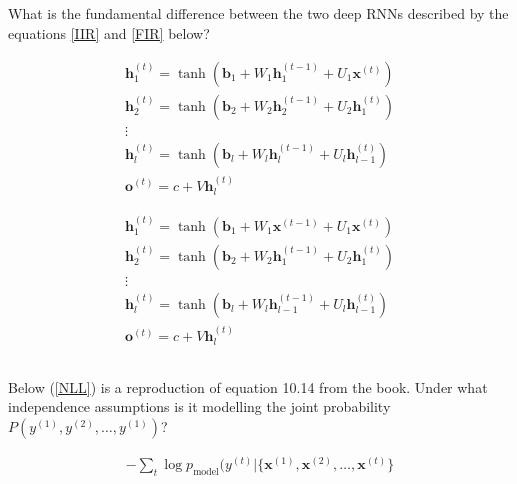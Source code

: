 \documentclass[a4paper]{report} \usepackage{amsmath}
\renewcommand{\vec}[1]{{\boldsymbol{#1}}}
\newcommand{\tvec}[2]{{\vec{#1}^{(#2)}}}
\newcommand{\stvec}[3]{{\vec{#1}_{#2}^{(#3)}}}
\begin{document}
\subsection{} What is the fundamental difference between the two deep RNNs described by the equations \ref{IIR} and \ref{FIR} below?

  \begin{equation}
    \label{IIR}
\begin{gathered}
  \stvec{h}{1}{t} = \tanh(\vec{b}_1 + W_1 \stvec{h}{1}{t-1} +
  U_1\tvec{x}{t})\\ \stvec{h}{2}{t} = \tanh(\vec{b}_2 + W_2
  \stvec{h}{2}{t-1} + U_2\stvec{h}{1}{t})\\ \vdots \\ \stvec{h}{l}{t}
  = \tanh(\vec{b}_l + W_l \stvec{h}{l}{t-1} +
  U_l\stvec{h}{l-1}{t})\\ \tvec{o}{t} = c + V\stvec{h}{l}{t}
\end{gathered}
\end{equation}

  \vspace{10mm}

  \begin{equation}
    \label{FIR}
\begin{gathered}
  \stvec{h}{1}{t} = \tanh(\vec{b}_1 + W_1 \tvec{x}{t-1} +
  U_1\tvec{x}{t})\\ \stvec{h}{2}{t} = \tanh(\vec{b}_2 + W_2
  \stvec{h}{1}{t-1} + U_2\stvec{h}{1}{t})\\ \vdots \\ \stvec{h}{l}{t}
  = \tanh(\vec{b}_l + W_l \stvec{h}{l-1}{t-1} +
  U_l\stvec{h}{l-1}{t})\\ \tvec{o}{t} = c + V\stvec{h}{l}{t}
\end{gathered}
\end{equation}

  \subsection{}
  Below (\ref{NLL}) is a reproduction of equation 10.14 from the
  book. Under what independence assumptions is it modelling the joint
  probability $P(y^{(1)}, y^{(2)}, \ldots, y^{(1)})$?

  \begin{equation}
    \label{NLL}
    \begin{gathered}
      -\sum_t \log p_{\text{model}}(y^{(t)} | \{\tvec{x}{1},
      \tvec{x}{2}, \ldots, \tvec{x}{t}\}
\end{gathered}
\end{equation}
\end{document}
